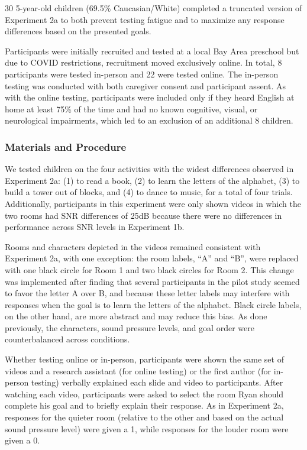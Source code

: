 \documentclass[10pt, letterpaper]{article}
\begin{document}
30 5-year-old children (69.5\% Caucasian/White) completed a truncated
version of Experiment 2a to both prevent testing fatigue and to maximize
any response differences based on the presented goals.

Participants were initially recruited and tested at a local Bay Area
preschool but due to COVID restrictions, recruitment moved exclusively
online. In total, 8 participants were tested in-person and 22 were
tested online. The in-person testing was conducted with both caregiver
consent and participant assent. As with the online testing, participants
were included only if they heard English at home at least 75\% of the
time and had no known cognitive, visual, or neurological impairments,
which led to an exclusion of an additional 8 children.

\hypertarget{materials-and-procedure-3}{%
\subsubsection{Materials and
Procedure}\label{materials-and-procedure-3}}

We tested children on the four activities with the widest differences
observed in Experiment 2a: (1) to read a book, (2) to learn the letters
of the alphabet, (3) to build a tower out of blocks, and (4) to dance to
music, for a total of four trials. Additionally, participants in this
experiment were only shown videos in which the two rooms had SNR
differences of 25dB because there were no differences in performance
across SNR levels in Experiment 1b.

Rooms and characters depicted in the videos remained consistent with
Experiment 2a, with one exception: the room labels, ``A'' and ``B'',
were replaced with one black circle for Room 1 and two black circles for
Room 2. This change was implemented after finding that several
participants in the pilot study seemed to favor the letter A over B, and
because these letter labels may interfere with responses when the goal
is to learn the letters of the alphabet. Black circle labels, on the
other hand, are more abstract and may reduce this bias. As done
previously, the characters, sound pressure levels, and goal order were
counterbalanced across conditions.

Whether testing online or in-person, participants were shown the same
set of videos and a research assistant (for online testing) or the first
author (for in-person testing) verbally explained each slide and video
to participants. After watching each video, participants were asked to
select the room Ryan should complete his goal and to briefly explain
their response. As in Experiment 2a, responses for the quieter room
(relative to the other and based on the actual sound pressure level)
were given a 1, while responses for the louder room were given a 0.
\end{document}
